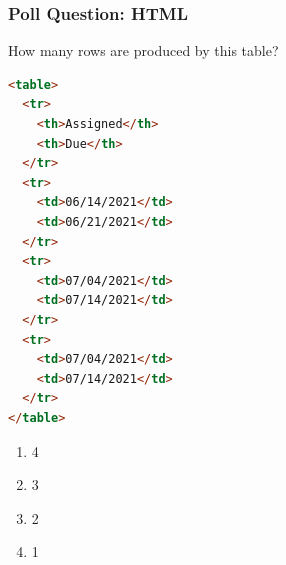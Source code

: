 \documentclass{beamer}
\begin{document}
%
%
\begin{frame}[fragile]
  \frametitle{Poll Question: HTML}
  How many rows are produced by this table?\\
  \begin{minipage}{0.49\textwidth}
  \begin{lstlisting}[language=html, basicstyle=\scriptsize]
<table>
  <tr>
    <th>Assigned</th>
    <th>Due</th>
  </tr>
  <tr>
    <td>06/14/2021</td>
    <td>06/21/2021</td>
  </tr>
  <tr>
    <td>07/04/2021</td>
    <td>07/14/2021</td>
  </tr>
  <tr>
    <td>07/04/2021</td>
    <td>07/14/2021</td>
  </tr>
</table>
    \end{lstlisting} 
  \end{minipage}
  \hfill
  \begin{minipage}{0.39\textwidth}
    \begin{enumerate}[A]
      \item 4
      \item 3
      \item 2
      \item 1
    \end{enumerate}
  \end{minipage}
\end{frame}
\end{document}
